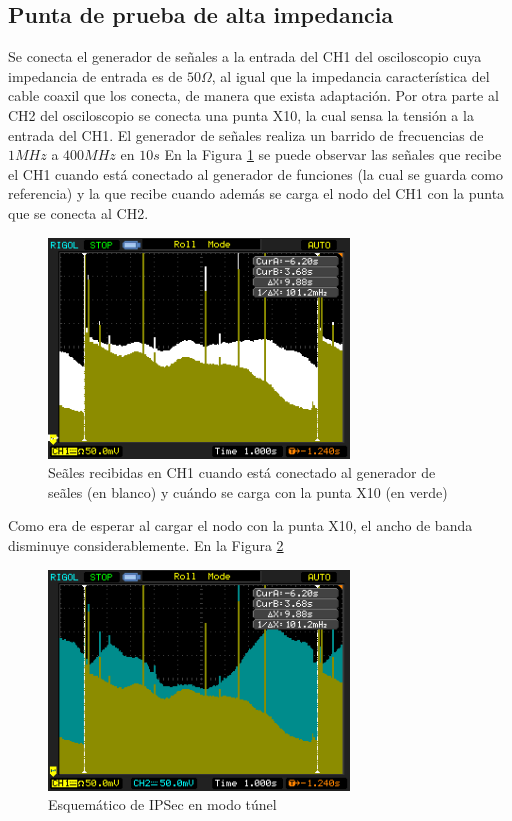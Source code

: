 \documentclass[a4paper,10pt]{article}
\begin{document}
		\subsection{Punta de prueba de alta impedancia}
		Se conecta el generador de se\~nales a la entrada del CH1 del osciloscopio cuya impedancia de entrada es de $50 \Omega$, al igual que la impedancia caracter\'istica del cable coaxil que los conecta, de manera que exista adaptaci\'on. Por otra parte al CH2 del osciloscopio se conecta una punta X10, la cual sensa la tensi\'on a la entrada del CH1.
		El generador de se\~nales realiza un barrido de frecuencias de $1MHz$ a $400MHz$ en $10s$
		En la Figura \ref{img001} se puede observar las se\~nales que recibe el CH1 cuando est\'a conectado al generador de funciones (la cual se guarda como referencia) y la que recibe cuando adem\'as se carga el nodo del CH1 con la punta que se conecta al CH2.
			\begin{figure}[!htb]
				\centering
				\includegraphics[width=8cm]{Imagenes/Mediciones instrumentos/NewFile1.png}
				\caption{Se\~ales recibidas en CH1 cuando est\'a conectado al generador de se\~ales (en blanco) y cu\'ando se carga con la punta X10 (en verde)} \label{img001}
			\end{figure}
		Como era de esperar al cargar el nodo con la punta X10, el ancho de banda disminuye considerablemente.
		En la Figura \ref{img000}
			\begin{figure}[!htb]
				\centering
				\includegraphics[width=8cm]{Imagenes/Mediciones instrumentos/NewFile0.png}
				\caption{Esquemático de IPSec en modo t\'unel} \label{img000}
			\end{figure}
			
\end{document}
